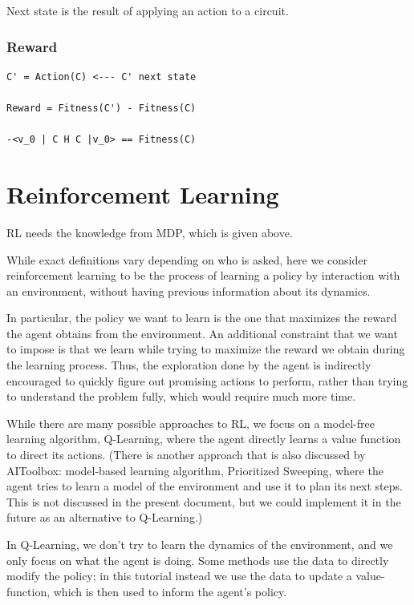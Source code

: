 \documentclass{article}
\begin{document}
Next state is the result of applying an action to a circuit.

\subsubsection{Reward}

\begin{small}
\begin{verbatim}
C' = Action(C) <--- C' next state

Reward = Fitness(C') - Fitness(C)

-<v_0 | C H C |v_0> == Fitness(C)
\end{verbatim}
\end{small}


\section{Reinforcement Learning}
RL needs the knowledge from MDP, which is given above.

While exact definitions vary depending on who is asked, here we consider reinforcement learning to be the process of learning a policy by interaction with an environment, without having previous information about its dynamics.

In particular, the policy we want to learn is the one that maximizes the reward the agent obtains from the environment.
An additional constraint that we want to impose is that we learn while trying to maximize the reward we obtain during the learning process. 
Thus, the exploration done by the agent is indirectly encouraged to quickly figure out promising actions to perform,
rather than trying to understand the problem fully, which would require much more time.

While there are many possible approaches to RL,  we focus on
a model-free learning algorithm, Q-Learning, where the agent directly learns a value function to direct its actions.
(There is another approach that is also discussed by AIToolbox: model-based learning algorithm, Prioritized Sweeping, where the agent tries to learn a model 
of the environment and use it to plan its next steps. This is not discussed in the present document, but we could implement it in the future
as an alternative to Q-Learning.)

In Q-Learning, we don't try to learn the dynamics of the environment, and we only focus on what the agent is doing.
Some methods use the data to directly modify the policy; in this tutorial instead we use the data to update a value-function, 
which is then used to inform the agent's policy.
\end{document}
